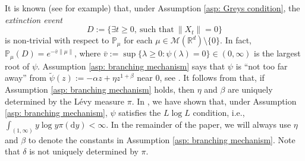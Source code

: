 \documentclass[12pt,a4paper]{amsart}
\theoremstyle{plain}
\theoremstyle{definition}
\numberwithin{equation}{section}
\begin{document}
It is known (see \cite[Theorems 12.5 \& 12.7]{Kyprianou2014Fluctuations} for example) that, under Assumption \ref{asp: Greys condition}, the \emph{extinction event}
$$D :=\{\exists t\geq 0,~\text{such that}~ \|X_t\| =0 \}$$
is non-trivial with respect to $\mathbb P_\mu$ for each  $\mu \in \mathcal M(\mathbb R^d)\setminus\{0\}$.
In fact, $ \mathbb{P}_{\mu} (D) = e^{-\bar v \|\mu\|}$, where $ \bar v := \sup\{\lambda \geq 0: \psi(\lambda) = 0\} \in (0,\infty) $ is the largest root of $\psi$.
Assumption \ref{asp: branching mechanism} says that $\psi$ is ``not too far away'' from $\widetilde \psi(z) := - \alpha z + \eta z^{1+\beta}$ near $0$, see \cite[Remark 1.3]{RenSongSunZhao2019Stable}.
It follows from \cite[Lemma 2.2]{RenSongSunZhao2019Stable}  that, if Assumption \ref{asp: branching mechanism} holds, then $\eta$ and $\beta$ are uniquely determined by the L\'evy measure $\pi$.
In \cite[Lemma 2.3]{RenSongSunZhao2019Stable}, we have shown  that,
under Assumption \ref{asp: branching mechanism},
 $\psi$ satisfies the $L \log L$ condition, i.e., $ \int_{(1,\infty)} y\log y \pi(\mathrm dy) < \infty. $
	In the remainder of the paper, we will always use $\eta$ and $\beta$ to denote the constants in Assumption  \ref{asp: branching mechanism}.
	Note that $\delta$ is not uniquely determined by $\pi$.
\end{document}
